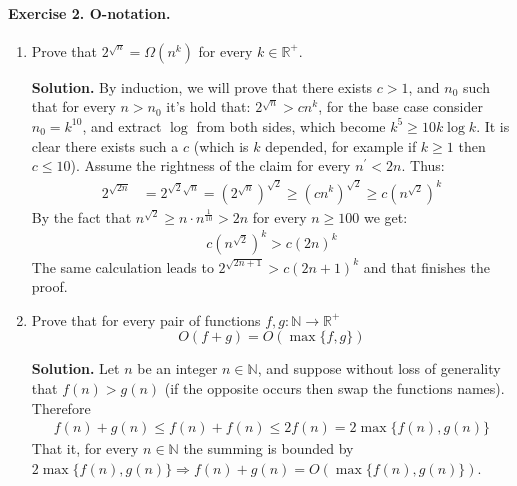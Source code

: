 \paragraph{Exercise 2. O-notation.}
\begin{enumerate}
\item Prove that \(2^{\sqrt{n}} = \Omega\left(n^k\right)\) for every \(k \in \mathbb{R}^{+}\). 

 \textbf{Solution.} By induction, we will prove that there exists \(c >1\), and \(n_0\) such that for every \( n > n_0\) it's hold that: \(2^{\sqrt{n}} > cn^k\), for the base case consider \(n_0 = k^{10}\), and extract \(\log\) from both sides, which become \( k^5 \ge 10k\log k\). It is clear there exists such a \(c\) (which is \(k\) depended, for example if \(k \ge 1 \) then \( c \le 10 \)). Assume the rightness of the claim for every \(n^\prime < 2n\). Thus: \begin{equation*}
 \begin{split}
     2^{\sqrt{2n}} &= 2^{\sqrt{2}\sqrt{n}} = \left( 2^{\sqrt{n}}\right)^{\sqrt{2}} \ge \left(cn^{k} \right)^{\sqrt{2}} \ge c\left(n^{\sqrt{2}}\right)^{k}
      \end{split}
 \end{equation*}
 By the fact that \( n^{\sqrt{2}} \ge n\cdot n^\frac{1}{10} > 2n \) for every \(n \ge 100 \) we get: 
 \begin{equation*}
 \begin{split}
      c\left(n^{\sqrt{2}}\right)^{k} > c\left(2n\right)^{k} 
      \end{split}
 \end{equation*}
The same calculation leads to \(2^{\sqrt{2n+1}} > c\left(2n+1\right)^{k}\) and that finishes the proof. 

\item Prove that for every pair of functions \(f,g : \mathbb{N} \rightarrow \mathbb{R}^{+}\) \begin{equation*}
     O \left( f + g \right) = O \left( \max{\{f,g\}} \right)
\end{equation*} 

 \textbf{Solution.} Let \(n\) be an integer \(n \in \mathbb{N}\), and suppose without loss of generality that \(f(n) > g(n)\) (if the opposite occurs then swap the functions names). Therefore   \begin{equation*}
 \begin{split}
     f(n) + g(n) \le f(n) + f(n) \le 2f(n) = 2 \max{\{f(n), g(n)\}}
      \end{split}
 \end{equation*}
That it, for every \(n \in \mathbb{N}\) the summing is bounded by \( 2 \max{\{f(n), g(n)\}} \Rightarrow f(n) + g(n) = O\left(\max{\{f(n), g(n)\}}\right)\).


\end{enumerate}

